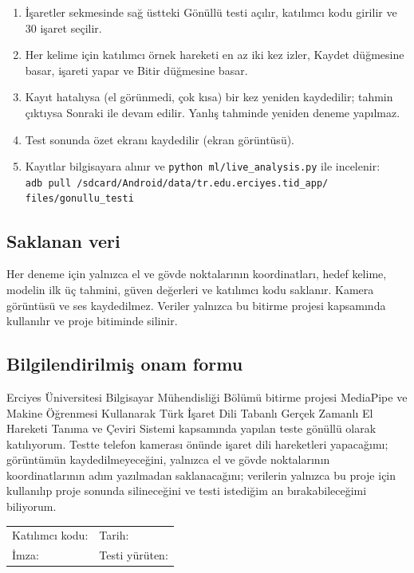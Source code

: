 \begin{enumerate}
  \item İşaretler sekmesinde sağ üstteki \sol Gönüllü testi\sag{} açılır, katılımcı
        kodu girilir ve 30 işaret seçilir.
  \item Her kelime için katılımcı örnek hareketi en az iki kez izler, \sol Kaydet\sag{}
        düğmesine basar, işareti yapar ve \sol Bitir\sag{} düğmesine basar.
  \item Kayıt hatalıysa (el görünmedi, çok kısa) bir kez yeniden kaydedilir; tahmin
        çıktıysa \sol Sonraki\sag{} ile devam edilir. Yanlış tahminde yeniden deneme
        yapılmaz.
  \item Test sonunda özet ekranı kaydedilir (ekran görüntüsü).
  \item Kayıtlar bilgisayara alınır ve \texttt{python ml/live\_analysis.py} ile incelenir:\\
        {\small\texttt{adb pull /sdcard/Android/data/tr.edu.erciyes.tid\_app/\\files/gonullu\_testi}}
\end{enumerate}

\subsection*{Saklanan veri}

Her deneme için yalnızca el ve gövde noktalarının koordinatları, hedef kelime,
modelin ilk üç tahmini, güven değerleri ve katılımcı kodu saklanır. Kamera görüntüsü
ve ses kaydedilmez. Veriler yalnızca bu bitirme projesi kapsamında kullanılır ve proje
bitiminde silinir.

\subsection*{Bilgilendirilmiş onam formu}

\noindent Erciyes Üniversitesi Bilgisayar Mühendisliği Bölümü bitirme projesi
\sol MediaPipe ve Makine Öğrenmesi Kullanarak Türk İşaret Dili Tabanlı Gerçek Zamanlı El
Hareketi Tanıma ve Çeviri Sistemi\sag{} kapsamında yapılan teste gönüllü olarak
katılıyorum. Testte telefon kamerası önünde işaret dili hareketleri yapacağımı;
görüntümün kaydedilmeyeceğini, yalnızca el ve gövde noktalarının koordinatlarının
adım yazılmadan saklanacağını; verilerin yalnızca bu proje için kullanılıp proje
sonunda silineceğini ve testi istediğim an bırakabileceğimi biliyorum.

\vspace{1cm}
\noindent
\begin{tabular}{@{}p{}p{}@{}}
Katılımcı kodu: \dotfill & Tarih: \dotfill \\[8mm]
İmza: \dotfill & Testi yürüten: \dotfill \\
\end{tabular}
